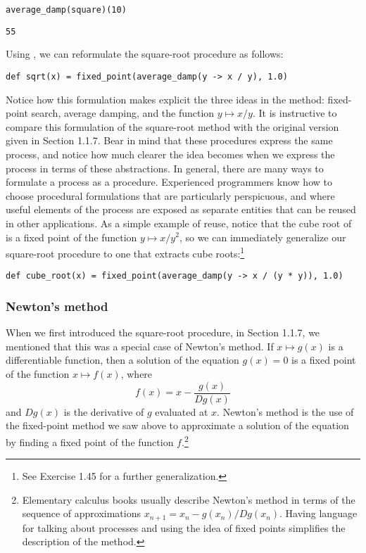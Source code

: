 \begin{lstlisting}[style=slate]
average_damp(square)(10)
\end{lstlisting}
\begin{verbatim}
55
\end{verbatim}

Using , we can reformulate the square-root procedure as follows:

\begin{lstlisting}[style=slate]
def sqrt(x) = fixed_point(average_damp(y -> x / y), 1.0)
\end{lstlisting}

Notice how this formulation makes explicit the three ideas in the method: fixed-point search, average damping, and the function $y \mapsto x/y$. It is instructive to compare this formulation of the square-root method with the original version given in Section 1.1.7. Bear in mind that these procedures express the same process, and notice how much clearer the idea becomes when we express the process in terms of these abstractions. In general, there are many ways to formulate a process as a procedure. Experienced programmers know how to choose procedural formulations that are particularly perspicuous, and where useful elements of the process are exposed as separate entities that can be reused in other applications. As a simple example of reuse, notice that the cube root of  is a fixed point of the function $y \mapsto x/y^2$, so we can immediately generalize our square-root procedure to one that extracts cube roots:\footnote{See Exercise 1.45 for a further generalization.}

\begin{lstlisting}[style=slate]
def cube_root(x) = fixed_point(average_damp(y -> x / (y * y)), 1.0)
\end{lstlisting}

\subsubsection{Newton's method}

When we first introduced the square-root procedure, in Section 1.1.7, we mentioned that this was a special case of Newton's method. If $x \mapsto g(x)$ is a differentiable function, then a solution of the equation $g(x) = 0$ is a fixed point of the function $x \mapsto f(x)$, where
\[
f(x) = x - \frac{g(x)}{Dg(x)}
\]
and $Dg(x)$ is the derivative of $g$ evaluated at $x$. Newton's method is the use of the fixed-point method we saw above to approximate a solution of the equation by finding a fixed point of the function $f$.\footnote{Elementary calculus books usually describe Newton's method in terms of the sequence of approximations $x_{n+1} = x_n - g(x_n)/Dg(x_n)$. Having language for talking about processes and using the idea of fixed points simplifies the description of the method.}

